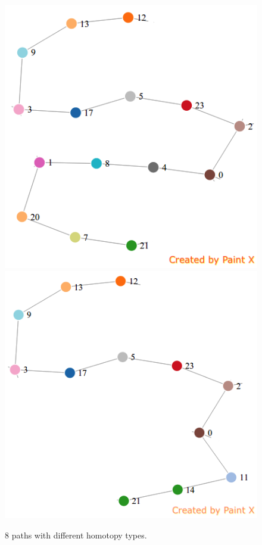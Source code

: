 \documentclass[11pt]{article}
\begin{document}
\begin{figure}
	{\includegraphics[scale=0.28]{./pics/paths/7.png}}
	{\includegraphics[scale=0.28]{./pics/paths/8.png}}
	\caption{\label{paths} 8 paths with different homotopy types. }
\end{figure}

%
\end{document}
